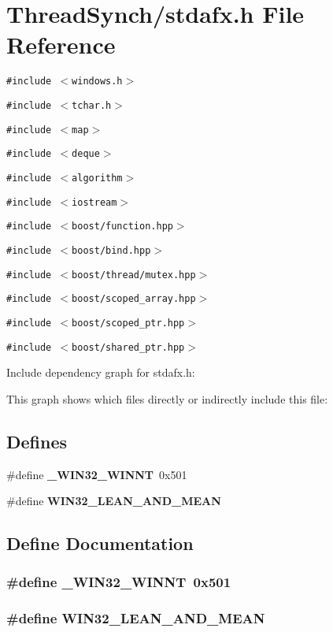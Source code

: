 \section{Thread\-Synch/stdafx.h File Reference}
\label{stdafx_8h}
{\tt \#include $<$windows.h$>$}\par
{\tt \#include $<$tchar.h$>$}\par
{\tt \#include $<$map$>$}\par
{\tt \#include $<$deque$>$}\par
{\tt \#include $<$algorithm$>$}\par
{\tt \#include $<$iostream$>$}\par
{\tt \#include $<$boost/function.hpp$>$}\par
{\tt \#include $<$boost/bind.hpp$>$}\par
{\tt \#include $<$boost/thread/mutex.hpp$>$}\par
{\tt \#include $<$boost/scoped\_\-array.hpp$>$}\par
{\tt \#include $<$boost/scoped\_\-ptr.hpp$>$}\par
{\tt \#include $<$boost/shared\_\-ptr.hpp$>$}\par


Include dependency graph for stdafx.h:

This graph shows which files directly or indirectly include this file:\subsection*{Defines}
\begin{CompactItemize}
\item 
\#define {\bf \_\-WIN32\_\-WINNT}~0x501
\item 
\#define {\bf WIN32\_\-LEAN\_\-AND\_\-MEAN}
\end{CompactItemize}


\subsection{Define Documentation}
\subsubsection{\setlength{\rightskip}{0pt plus 5cm}\#define \_\-WIN32\_\-WINNT~0x501}\label{stdafx_8h_c50762666aa00bd3a4308158510f1748}


\subsubsection{\setlength{\rightskip}{0pt plus 5cm}\#define WIN32\_\-LEAN\_\-AND\_\-MEAN}\label{stdafx_8h_c7bef5d85e3dcd73eef56ad39ffc84a9}


